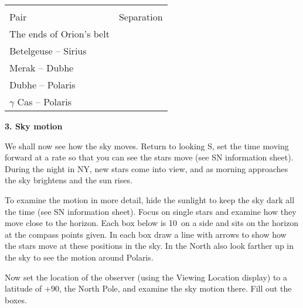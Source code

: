 \begin{center}
\begin{tabular}{lc} \hline \\ [-6pt]
Pair   & \hspace{1cm} Separation \hspace{1cm} \\ [6pt]
\hline
The ends of Orion's belt    &        \\ \hline
Betelgeuse -- Sirius         &       \\ \hline
Merak -- Dubhe            &      \\ \hline
Dubhe -- Polaris          &      \\ \hline
$\gamma$ Cas -- Polaris &  \\ \hline
\end{tabular}
\end{center}

\newpage

\bigskip
\noindent
{\bf 3. Sky motion}

\medskip
\noindent
We shall now see how the sky moves. Return to looking S, set the
time moving forward at a rate so that you can see the stars move (see
SN information sheet). During the night in NY, new
stars come into view, and as morning approaches the sky brightens and
the sun rises.

To examine the motion in more detail, hide the sunlight to keep the
sky dark all the time (see SN information sheet).  Focus on single
stars and examine how they move close to the horizon. Each box below is
10\deg\ on a side and sits on the horizon at the compass points
given. In each box draw a line with arrows to show how the stars move
at these positions in the sky.  In the North also look farther up in
the sky to see the motion around Polaris.


        \begin{figure*}[h]
        \centerline{}
        \caption{}
         \end{figure*}


\noindent
Now set the location of the observer (using the Viewing Location display) to a
latitude of +90\deg, the North Pole, and examine the sky motion
there. Fill out the boxes.



        \begin{figure*}[h]
        \centerline{}
        \caption{}
         \end{figure*}

